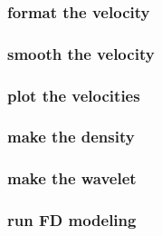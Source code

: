 \begin{frame} \frametitle{format the velocity}
  \normalsize
  \blueshade{
    
  }
\end{frame}
\cwpnote{}

\begin{frame} \frametitle{smooth the velocity}
  \normalsize
  \blueshade{
    
  }
\end{frame}
\cwpnote{}

\begin{frame} \frametitle{plot the velocities}
  \normalsize
  \blueshade{
    
  }
\end{frame}
\cwpnote{}

\begin{frame}  \end{frame}
\begin{frame}  \end{frame}

\begin{frame} \frametitle{make the density}
  \normalsize
  \blueshade{
    
  }
\end{frame}
\cwpnote{}

\begin{frame} \frametitle{make the wavelet}
  \normalsize
  \blueshade{
    
  }
\end{frame}
\cwpnote{}

\begin{frame}  \end{frame}

\begin{frame} \frametitle{run FD modeling}
  \normalsize
  \blueshade{
    
  }
\end{frame}
\cwpnote{}

